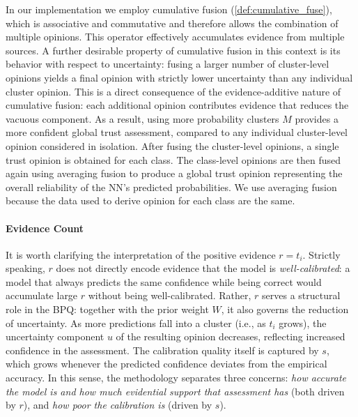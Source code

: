 In our implementation we employ cumulative fusion (\cref{def:cumulative_fuse}), which is associative and commutative and therefore allows the combination of multiple opinions. This operator effectively accumulates evidence from multiple sources. A further desirable property of cumulative fusion in this context is its behavior with respect to uncertainty: fusing a larger number of cluster-level opinions yields a final opinion with strictly lower uncertainty than any individual cluster opinion. This is a direct consequence of the evidence-additive nature of cumulative fusion: each additional opinion contributes evidence that reduces the vacuous component. As a result, using more probability clusters $M$ provides a more confident global trust assessment, compared to any individual cluster-level opinion considered in isolation. After fusing the cluster-level opinions, a single trust opinion is obtained for each class. The class-level opinions are then fused again using averaging fusion to produce a global trust opinion representing the overall reliability of the \ac{NN}'s predicted probabilities. We use averaging fusion because the data used to derive opinion for each class are the same.



\paragraph{Evidence Count}
It is worth clarifying the interpretation of the positive evidence $r=t_i$. Strictly speaking, $r$ does not directly encode evidence that the model is \emph{well-calibrated}: a model that always predicts the same confidence while being correct would accumulate large $r$ without being well-calibrated. Rather, $r$ serves a structural role in the \ac{BPQ}: together with the prior weight $W$, it also governs the reduction of uncertainty. As more predictions fall into a cluster (i.e., as $t_i$ grows), the uncertainty component $u$ of the resulting opinion decreases, reflecting increased confidence in the assessment. The calibration quality itself is captured by $s$, which grows whenever the predicted confidence deviates from the empirical accuracy. In this sense, the methodology separates three concerns: 
\emph{how accurate the model is and how much evidential support that assessment has} (both driven by $r$), and \emph{how poor the calibration is} (driven by $s$).

